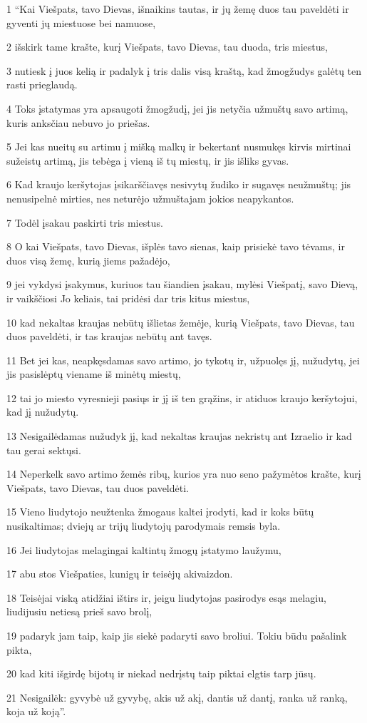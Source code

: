 \par 1 “Kai Viešpats, tavo Dievas, išnaikins tautas, ir jų žemę duos tau paveldėti ir gyventi jų miestuose bei namuose, 
\par 2 išskirk tame krašte, kurį Viešpats, tavo Dievas, tau duoda, tris miestus, 
\par 3 nutiesk į juos kelią ir padalyk į tris dalis visą kraštą, kad žmogžudys galėtų ten rasti prieglaudą. 
\par 4 Toks įstatymas yra apsaugoti žmogžudį, jei jis netyčia užmuštų savo artimą, kuris anksčiau nebuvo jo priešas. 
\par 5 Jei kas nueitų su artimu į mišką malkų ir bekertant nusmukęs kirvis mirtinai sužeistų artimą, jis tebėga į vieną iš tų miestų, ir jis išliks gyvas. 
\par 6 Kad kraujo keršytojas įsikarščiavęs nesivytų žudiko ir sugavęs neužmuštų; jis nenusipelnė mirties, nes neturėjo užmuštajam jokios neapykantos. 
\par 7 Todėl įsakau paskirti tris miestus. 
\par 8 O kai Viešpats, tavo Dievas, išplės tavo sienas, kaip prisiekė tavo tėvams, ir duos visą žemę, kurią jiems pažadėjo, 
\par 9 jei vykdysi įsakymus, kuriuos tau šiandien įsakau, mylėsi Viešpatį, savo Dievą, ir vaikščiosi Jo keliais, tai pridėsi dar tris kitus miestus, 
\par 10 kad nekaltas kraujas nebūtų išlietas žemėje, kurią Viešpats, tavo Dievas, tau duos paveldėti, ir tas kraujas nebūtų ant tavęs. 
\par 11 Bet jei kas, neapkęsdamas savo artimo, jo tykotų ir, užpuolęs jį, nužudytų, jei jis pasislėptų viename iš minėtų miestų, 
\par 12 tai jo miesto vyresnieji pasiųs ir jį iš ten grąžins, ir atiduos kraujo keršytojui, kad jį nužudytų. 
\par 13 Nesigailėdamas nužudyk jį, kad nekaltas kraujas nekristų ant Izraelio ir kad tau gerai sektųsi. 
\par 14 Neperkelk savo artimo žemės ribų, kurios yra nuo seno pažymėtos krašte, kurį Viešpats, tavo Dievas, tau duos paveldėti. 
\par 15 Vieno liudytojo neužtenka žmogaus kaltei įrodyti, kad ir koks būtų nusikaltimas; dviejų ar trijų liudytojų parodymais remsis byla. 
\par 16 Jei liudytojas melagingai kaltintų žmogų įstatymo laužymu, 
\par 17 abu stos Viešpaties, kunigų ir teisėjų akivaizdon. 
\par 18 Teisėjai viską atidžiai ištirs ir, jeigu liudytojas pasirodys esąs melagiu, liudijusiu netiesą prieš savo brolį, 
\par 19 padaryk jam taip, kaip jis siekė padaryti savo broliui. Tokiu būdu pašalink pikta, 
\par 20 kad kiti išgirdę bijotų ir niekad nedrįstų taip piktai elgtis tarp jūsų. 
\par 21 Nesigailėk: gyvybė už gyvybę, akis už akį, dantis už dantį, ranka už ranką, koja už koją”.



